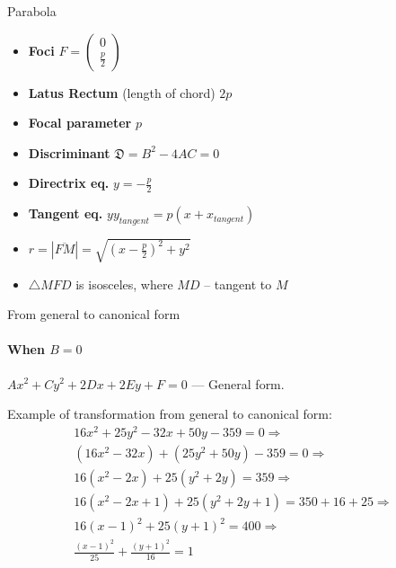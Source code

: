 \documentclass[aspectratio=169,notes]{beamer}
\begin{document}
\begin{frame}[t]{Parabola}
\begin{multicols}{3}
\begin{itemize}
        \item \textbf{Foci} $F = \begin{pmatrix} 0\\\frac{p}{2} \end{pmatrix}$
        \item \textbf{Latus Rectum} (length of chord) $2p$
        \item \textbf{Focal parameter}  $p$
        \item \textbf{Discriminant} $\mathfrak{D} = B^2 - 4AC = 0$
        \item \textbf{Directrix eq.} $y = -\frac{p}{2}$
        \item \textbf{Tangent eq.} $yy_{tangent} = p(x+x_{tangent})$
        \item $r = |\overline{FM}|=\sqrt{(x-\frac{p}{2})^2+y^2}$
        \item $\triangle MFD$ is isosceles, where $MD$ -- tangent to $M$
        \end{itemize}
\end{multicols}
\end{frame}

\begin{frame}[t]{From general to canonical form}
\framesubtitle{When $B=0$}
    $Ax^2 +Cy^2 +2Dx + 2Ey +F = 0$ --- General form. \medskip

    Example of transformation from general to canonical form:
    \begin{align*}
        16x^2 + 25y^2 - 32x + 50y -359 = 0 \Rightarrow \\
        (16x^2 - 32x) + (25y^2 +50y) -359 = 0 \Rightarrow \\ 
        16(x^2 - 2x) + 25(y^2 + 2y) = 359 \Rightarrow \\ 
        16(x^2 -2x +1) + 25(y^2 +2y +1) = 350 + 16 + 25 \Rightarrow \\
        16(x-1)^2 +25(y+1)^2 = 400 \Rightarrow \\ 
        \frac{(x-1)^2}{25}+\frac{(y+1)^2}{16}=1
    \end{align*}
\end{frame}
\end{document}
